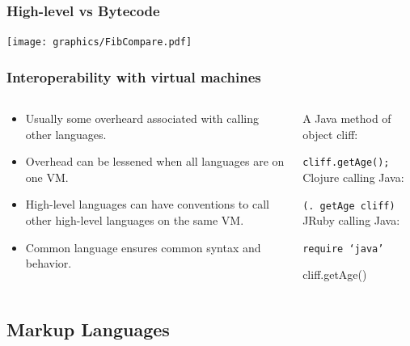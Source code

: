 \documentclass{beamer}
\newcommand{\linespace}{\vskip 0.25cm}
\begin{document}
\begin{frame}
  \frametitle{High-level vs Bytecode}
  \texttt{[image: graphics/FibCompare.pdf]}
\end{frame}

\begin{frame}
 \frametitle{Interoperability with virtual machines}
 \begin{columns}
 \begin{column}{0.5\textwidth}
 \begin{itemize}
 \item Usually some overheard associated with calling other languages.
 \item Overhead can be lessened when all languages are on one VM.
 \item High-level languages can have conventions to call other high-level languages on the same VM.
 \item Common language ensures common syntax and behavior.
 \end{itemize}
 \end{column}
 
 \begin{column}{0.5\textwidth}
 
 A Java method of object cliff:

 {\tt cliff.getAge();}
 \linespace
 \linespace
 Clojure calling Java:
 
 {\tt (. getAge cliff)}
 \linespace
 \linespace
 JRuby calling Java:
 
 {\tt require `java'
 
 cliff.getAge()}
 \end{column}
 \end{columns}
\end{frame}
\subsection{Markup Languages}
\end{document}
